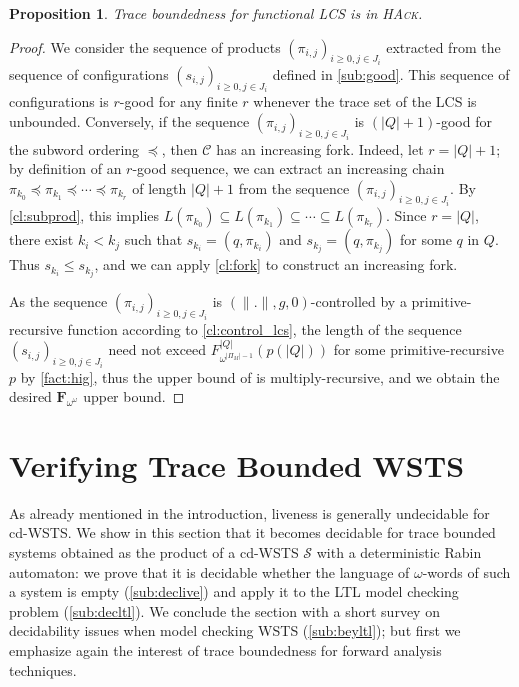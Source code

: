 \documentclass[11pt,reqno,a4paper]{amsart}
\newcommand{\norm}[1]{\|#1\|}
\newcommand{\subword}{\preceq}
\theoremstyle{plain}
\newtheorem{proposition}[theorem]{Proposition}
\theoremstyle{definition}
\theoremstyle{remark}
\begin{document}
\begin{proposition}
  Trace boundedness for functional LCS is in \textsc{HAck}.
\end{proposition}
\begin{proof}
  We consider the sequence of products $(\pi_{i,j})_{i\geq 0,j\in
    J_i}$ extracted from the sequence of configurations
  $(s_{i,j})_{i\geq 0,j\in J_i}$ defined in \autoref{sub:good}.  This
  sequence of configurations is $r$-good for any finite $r$ whenever
  the trace set of the LCS is unbounded.  Conversely, if the sequence
  $(\pi_{i,j})_{i\geq 0,j\in J_i}$ is $(|Q|+1)$-good for the subword
  ordering $\subword$, then $\mathcal{C}$ has an increasing fork.
  Indeed, let $r=|Q|+1$; by definition of an $r$-good sequence, we can
  extract an increasing chain
  $\pi_{k_0}\subword\pi_{k_1}\subword\cdots\subword\pi_{k_r}$ of
  length $|Q|+1$ from the sequence $(\pi_{i,j})_{i\geq 0,j\in J_i}$.
  By \autoref{cl:subprod}, this implies $L(\pi_{k_0})\subseteq
  L(\pi_{k_1})\subseteq\cdots\subseteq L(\pi_{k_r})$.  Since $r=|Q|$,
  there exist $k_i<k_j$ such that $s_{k_i}=(q,\pi_{k_i})$ and
  $s_{k_j}=(q,\pi_{k_j})$ for some $q$ in $Q$.  Thus $s_{k_i}\leq
  s_{k_j}$, and we can apply \autoref{cl:fork} to construct an
  increasing fork.

  As the sequence $(\pi_{i,j})_{i\geq 0,j\in J_i}$ is
  $(\norm{.},g,0)$-controlled by a primitive-recursive function
  according to \autoref{cl:control_lcs}, the length of the sequence
  $(s_{i,j})_{i\geq 0,j\in J_i}$ need not exceed
  $F^{|Q|}_{\omega^{|\Pi_M|-1}}(p(|Q|))$ for some primitive-recursive
  $p$ by \autoref{fact:hig}, thus the upper bound of is
  multiply-recursive, and we obtain the desired
  $\mathbf{F}_{\omega^\omega}$ upper bound.
\end{proof}






















\section{Verifying Trace Bounded WSTS}\label{sec:live}
As already mentioned in the introduction, liveness is generally
undecidable for cd-WSTS.  We show in this section
that it becomes decidable for trace bounded systems obtained as the
product of a cd-WSTS $\mathcal{S}$ with a
deterministic Rabin automaton: we prove that it is decidable whether the
language of $\omega$-words of such a system is empty
(\autoref{sub:declive}) and apply it to the LTL model checking problem
(\autoref{sub:decltl}).  We conclude the section with a short survey on
decidability issues when model checking WSTS (\autoref{sub:beyltl}); but
first we emphasize again the interest of trace boundedness for forward
analysis techniques.
\end{document}

